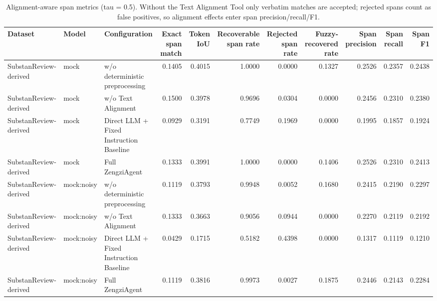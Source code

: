 \begin{table}
\caption{Alignment-aware span metrics (tau = 0.5). Without the Text Alignment Tool only verbatim matches are accepted; rejected spans count as false positives, so alignment effects enter span precision/recall/F1.}
\label{tab:table_alignment}
\begin{tabular}{lllrrrrrrrr}
\toprule
Dataset & Model & Configuration & Exact span match & Token IoU & Recoverable span rate & Rejected span rate & Fuzzy-recovered rate & Span precision & Span recall & Span F1 \\
\midrule
SubstanReview-derived & mock & w/o deterministic preprocessing & 0.1405 & 0.4015 & 1.0000 & 0.0000 & 0.1327 & 0.2526 & 0.2357 & 0.2438 \\
SubstanReview-derived & mock & w/o Text Alignment & 0.1500 & 0.3978 & 0.9696 & 0.0304 & 0.0000 & 0.2456 & 0.2310 & 0.2380 \\
SubstanReview-derived & mock & Direct LLM + Fixed Instruction Baseline & 0.0929 & 0.3191 & 0.7749 & 0.1969 & 0.0000 & 0.1995 & 0.1857 & 0.1924 \\
SubstanReview-derived & mock & Full ZengziAgent & 0.1333 & 0.3991 & 1.0000 & 0.0000 & 0.1406 & 0.2526 & 0.2310 & 0.2413 \\
SubstanReview-derived & mock:noisy & w/o deterministic preprocessing & 0.1119 & 0.3793 & 0.9948 & 0.0052 & 0.1680 & 0.2415 & 0.2190 & 0.2297 \\
SubstanReview-derived & mock:noisy & w/o Text Alignment & 0.1333 & 0.3663 & 0.9056 & 0.0944 & 0.0000 & 0.2270 & 0.2119 & 0.2192 \\
SubstanReview-derived & mock:noisy & Direct LLM + Fixed Instruction Baseline & 0.0429 & 0.1715 & 0.5182 & 0.4398 & 0.0000 & 0.1317 & 0.1119 & 0.1210 \\
SubstanReview-derived & mock:noisy & Full ZengziAgent & 0.1119 & 0.3816 & 0.9973 & 0.0027 & 0.1875 & 0.2446 & 0.2143 & 0.2284 \\
\bottomrule
\end{tabular}
\end{table}

